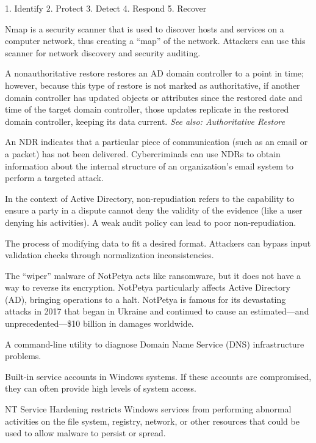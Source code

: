 1. Identify
2. Protect
3. Detect
4. Respond
5. Recover

 Nmap is a security scanner that is used to discover hosts and services on a computer network, thus creating a “map” of the network. Attackers can use this scanner for network discovery and security auditing.

 A nonauthoritative restore restores an AD domain controller to a point in time; however, because this type of restore is not marked as authoritative, if another domain controller has updated objects or attributes since the restored date and time of the target domain controller, those updates replicate in the restored domain controller, keeping its data current.
\textit{See also: Authoritative Restore}

 An NDR indicates that a particular piece of communication (such as an email or a packet) has not been delivered. Cybercriminals can use NDRs to obtain information about the internal structure of an organization’s email system to perform a targeted attack.

 In the context of Active Directory, non-repudiation refers to the capability to ensure a party in a dispute cannot deny the validity of the evidence (like a user denying his activities). A weak audit policy can lead to poor non-repudiation.

 The process of modifying data to fit a desired format. Attackers can bypass input validation checks through normalization inconsistencies.

 The “wiper” malware of NotPetya acts like ransomware, but it does not have a way to reverse its encryption. NotPetya particularly affects Active Directory (AD), bringing operations to a halt. NotPetya is famous for its devastating attacks in 2017 that began in Ukraine and continued to cause an estimated—and unprecedented—\$10 billion in damages worldwide.

 A command-line utility to diagnose Domain Name Service (DNS) infrastructure problems.

 Built-in service accounts in Windows systems. If these accounts are compromised, they can often provide high levels of system access.

 NT Service Hardening restricts Windows services from performing abnormal activities on the file system, registry, network, or other resources that could be used to allow malware to persist or spread.

